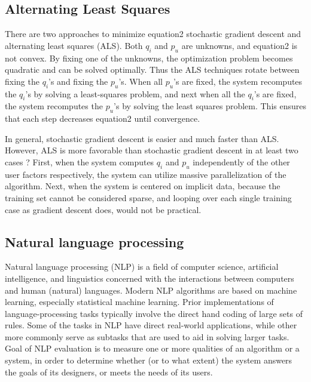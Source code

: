 \documentclass{article} %
\begin{document}
\subsection{ Alternating Least Squares }
There are two approaches \cite{ATTPaper2009} to minimize equation2  stochastic gradient descent and alternating least squares (ALS). Both $q_i$ and $p_u$ are unknowns, and equation2 is not convex. By fixing one of the unknowns, the optimization problem becomes quadratic and can be solved optimally. Thus the ALS techniques rotate between fixing the $q_i$'s and fixing the $p_u$'s. When all $p_u$'s are fixed, the system recomputes the $q_i$'s by solving a least-squares problem, and next when all the $q_i$'s are fixed, the system recomputes the $p_u$'s by solving the least squares problem. This ensures that each step decreases equation2 until convergence.

In general, stochastic gradient descent is easier and much faster than ALS. However, ALS is more favorable than stochastic gradient descent in at least two cases ? First, when the system computes $q_i$ and $p_u$ independently of the other user factors respectively, the system can utilize massive parallelization of the algorithm. Next, when the system is centered on implicit data, because the training set cannot be considered sparse, and looping over each single training case as gradient descent does, would not be practical.

\subsection{ Natural language processing }
Natural language processing (NLP) is a field of computer science, artificial intelligence, and linguistics concerned with the interactions between computers and human (natural) languages. Modern NLP algorithms are based on machine learning, especially statistical machine learning. Prior implementations of language-processing tasks typically involve the direct hand coding of large sets of rules. Some of the tasks in NLP have direct real-world applications, while other more commonly serve as subtasks that are used to aid in solving larger tasks. Goal of NLP evaluation is to measure one or more qualities of an algorithm or a system, in order to determine whether (or to what extent) the system answers the goals of its designers, or meets the needs of its users.
\end{document}
